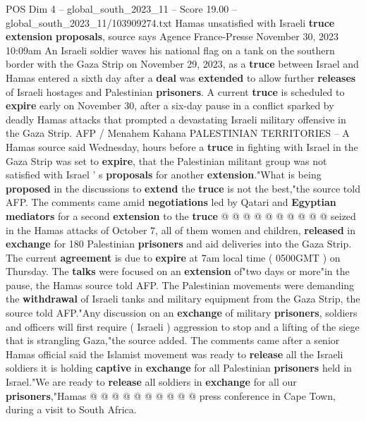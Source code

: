 \begin{textsample}{POS Dim 4 – global\_south\_2023\_11 – Score 19.00 – global\_south\_2023\_11/103909274.txt}  \label{ex:f4_pos_166}
Hamas unsatisfied with Israeli \textbf{truce} \textbf{extension} \textbf{proposals}, source says Agence France-Presse November 30, 2023 10:09am An Israeli soldier waves his national flag on a tank on the southern border with the Gaza Strip on November 29, 2023, as a \textbf{truce} between Israel and Hamas entered a sixth day after a \textbf{deal} was \textbf{extended} to allow further \textbf{releases} of Israeli hostages and Palestinian \textbf{prisoners}.
A current \textbf{truce} is scheduled to \textbf{expire} early on November 30, after a six-day pause in a conflict sparked by deadly Hamas attacks that prompted a devastating Israeli military offensive in the Gaza Strip.
AFP / Menahem Kahana PALESTINIAN TERRITORIES -- A Hamas source said Wednesday, hours before a \textbf{truce} in fighting with Israel in the Gaza Strip was set to \textbf{expire}, that the Palestinian militant group was not satisfied with Israel ' s \textbf{proposals} for another \textbf{extension}."What is being \textbf{proposed} in the discussions to \textbf{extend} the \textbf{truce} is not the best,"the source told AFP.
The comments came amid \textbf{negotiations} led by Qatari and \textbf{Egyptian} \textbf{mediators} for a second \textbf{extension} to the \textbf{truce} @ @ @ @ @ @ @ @ @ @ seized in the Hamas attacks of October 7, all of them women and children, \textbf{released} in \textbf{exchange} for 180 Palestinian \textbf{prisoners} and aid deliveries into the Gaza Strip.
The current \textbf{agreement} is due to \textbf{expire} at 7am local time ( 0500GMT ) on Thursday.
The \textbf{talks} were focused on an \textbf{extension} of"two days or more"in the pause, the Hamas source told AFP.
The Palestinian movements were demanding the \textbf{withdrawal} of Israeli tanks and military equipment from the Gaza Strip, the source told AFP."Any discussion on an \textbf{exchange} of military \textbf{prisoners}, soldiers and officers will first require ( Israeli ) aggression to stop and a lifting of the siege that is strangling Gaza,"the source added.
The comments came after a senior Hamas official said the Islamist movement was ready to \textbf{release} all the Israeli soldiers it is holding \textbf{captive} in \textbf{exchange} for all Palestinian \textbf{prisoners} held in Israel."We are ready to \textbf{release} all soldiers in \textbf{exchange} for all our \textbf{prisoners},"Hamas @ @ @ @ @ @ @ @ @ @ press conference in Cape Town, during a visit to South Africa.

\end{textsample}
